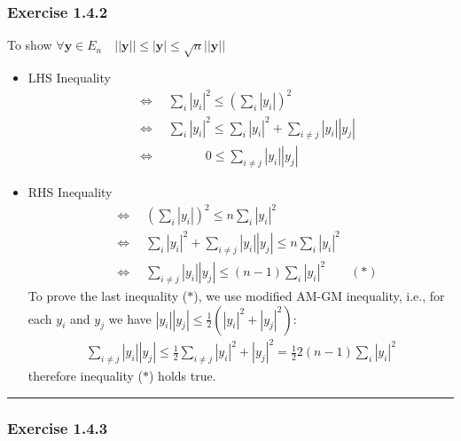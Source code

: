 \documentclass[12pt, letterpaper]{scrartcl}
\begin{document}
\subsubsection*{Exercise 1.4.2}
To show $\forall \bm{y}\in E_n\quad ||\bm{y}||\leq|\bm{y}|\leq\sqrt{n}||\bm{y}||$
\begin{itemize}
    \item LHS Inequality
    \begin{align*}
        &\Longleftrightarrow\quad\sum_i |y_i|^2\leq(\sum_i|y_i|)^2\\
        &\Longleftrightarrow\quad\sum_i |y_i|^2\leq\sum_i|y_i|^2+\sum_{i\neq j}|y_i||y_j|\\
        &\Longleftrightarrow\qquad\qquad0\leq\sum_{i\neq j}|y_i||y_j|
    \end{align*}

    \item RHS Inequality
    \begin{align*}
        &\Longleftrightarrow\quad(\sum_i|y_i|)^2\leq n\sum_i |y_i|^2\\
        &\Longleftrightarrow\quad\sum_i|y_i|^2+\sum_{i\neq j}|y_i||y_j|\leq n\sum_i |y_i|^2\\
        &\Longleftrightarrow\quad\sum_{i\neq j}|y_i||y_j|\leq (n-1)\sum_i |y_i|^2\qquad(*)
    \end{align*}
    To prove the last inequality ($*$), we use modified AM-GM inequality, i.e., for each $y_i$ and $y_j$ we have $|y_i||y_j|\leq\frac{1}{2}(|y_i|^2+|y_j|^2)$:
    \begin{align*}
        \sum_{i\neq j}|y_i||y_j|\leq\frac{1}{2}\sum_{i\neq j}|y_i|^2+|y_j|^2=\frac{1}{2}2(n-1)\sum_i|y_i|^2
    \end{align*}
    therefore inequality ($*$) holds true.
\end{itemize}
\vskip1mm\hrule

\subsubsection*{Exercise 1.4.3}
\end{document}
